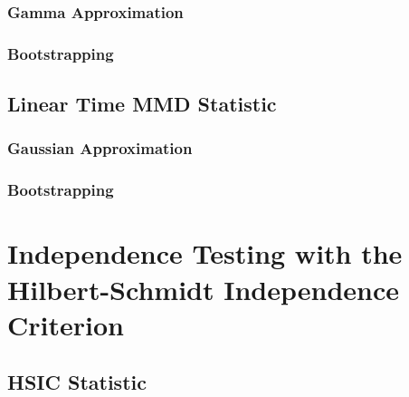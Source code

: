 \subsubsection{Gamma Approximation}
\subsubsection{Bootstrapping}

\subsection{Linear Time MMD Statistic}
\label{sec:mmd_linear}
\subsubsection{Gaussian Approximation}
\subsubsection{Bootstrapping}

\section{Independence Testing with the Hilbert-Schmidt Independence Criterion}
\label{sec:independence_testing_into}

\subsection{HSIC Statistic}
\label{sec:hsic_test}